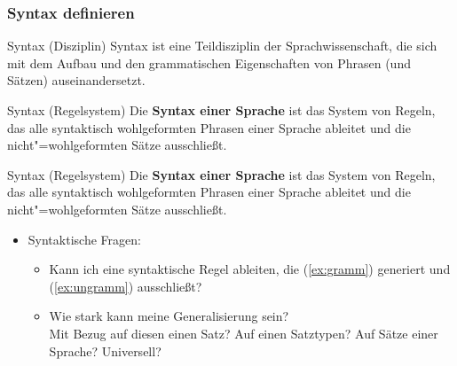 \begin{frame}
\frametitle{Syntax definieren}

\begin{block}{Syntax (Disziplin)}
Syntax ist eine Teildisziplin der Sprachwissenschaft, die sich mit dem Aufbau und den grammatischen Eigenschaften von Phrasen (und Sätzen) auseinandersetzt.
\end{block}

\begin{block}{Syntax (Regelsystem)}
Die \textbf{Syntax einer Sprache} ist das System von Regeln, das alle syntaktisch wohlgeformten Phrasen einer Sprache ableitet und die nicht"=wohlgeformten Sätze ausschließt.
\end{block}

\end{frame}






\begin{frame}

\begin{block}{Syntax (Regelsystem)}
Die \textbf{Syntax einer Sprache} ist das System von Regeln, das alle syntaktisch wohlgeformten Phrasen einer Sprache ableitet und die nicht"=wohlgeformten Sätze ausschließt.
\end{block}

	\settowidth{}
	\z
	
	\z
	
\begin{itemize}
	\item Syntaktische Fragen:\\
	\begin{itemize}
		\item Kann ich eine syntaktische Regel ableiten, die (\ref{ex:gramm}) generiert und (\ref{ex:ungramm}) ausschließt?
		\item Wie stark kann meine Generalisierung sein?\\
		\ras Mit Bezug auf diesen einen Satz? Auf einen Satztypen? Auf Sätze einer Sprache? Universell?
	\end{itemize}

\end{itemize}

\end{frame}


